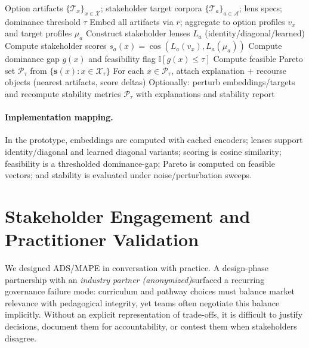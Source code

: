 \documentclass[sigconf,review]{acmart}
\newif\ifshort
\newif\ifdraft
\newcommand{\longonly}[1]{\ifshort\else #1\fi}
\newcommand{\draftonly}[1]{\ifdraft #1\fi}
\newcommand{\todo}[1]{\textcolor{red}{\textbf{[TODO: #1]}}}
\newcommand{\ADS}{\textsc{ADS}\xspace}
\newcommand{\MAPE}{\textsc{MAPE}\xspace}
\newcommand{\IndustryPartner}{\textit{industry partner (anonymized)}}
\begin{document}
\begin{algorithm}[t]
\caption{\MAPE in \ADS (prototype pipeline)}
\label{alg:mape}
\begin{algorithmic}[1]
\REQUIRE Option artifacts $\{\mathcal{T}_x\}_{x\in\mathcal{X}}$; stakeholder target corpora $\{\mathcal{T}_a\}_{a\in\mathcal{A}}$; lens specs; dominance threshold $\tau$
\STATE Embed all artifacts via $r$; aggregate to option profiles $v_x$ and target profiles $\mu_a$
\STATE Construct stakeholder lenses $L_a$ (identity/diagonal/learned)
  \STATE Compute stakeholder scores $s_a(x)=\cos(L_a(v_x),L_a(\mu_a))$
  \STATE Compute dominance gap $g(x)$ and feasibility flag $\mathbb{I}[g(x)\le\tau]$
\ENDFOR
\STATE Compute feasible Pareto set $\mathcal{P}_\tau$ from $\{\mathbf{s}(x): x\in\mathcal{X}_\tau\}$
\STATE For each $x\in\mathcal{P}_\tau$, attach explanation + recourse objects (nearest artifacts, score deltas)
\STATE Optionally: perturb embeddings/targets and recompute stability metrics
\RETURN $\mathcal{P}_\tau$ with explanations and stability report
\end{algorithmic}
\end{algorithm}

\longonly{\paragraph{Implementation mapping.} In the prototype, embeddings are computed with cached encoders; lenses support identity/diagonal and learned diagonal variants; scoring is cosine similarity; feasibility is a thresholded dominance-gap; Pareto is computed on feasible vectors; and stability is evaluated under noise/perturbation sweeps. \draftonly{\todo{Add concrete module paths once repo is frozen.}}}




\section{Stakeholder Engagement and Practitioner Validation}
\label{sec:collab}

We designed \ADS/\MAPE in conversation with practice. A design-phase partnership with an \IndustryPartner surfaced a recurring governance failure mode: curriculum and pathway choices must balance market relevance with pedagogical integrity, yet teams often negotiate this balance implicitly. Without an explicit representation of trade-offs, it is difficult to justify decisions, document them for accountability, or contest them when stakeholders disagree.
\end{document}
